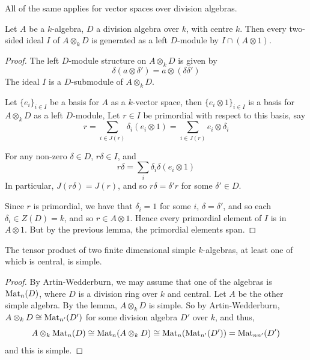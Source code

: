 \documentclass{article}
\begin{document}
\begin{remark}
    All of the same applies for vector spaces over division algebras.
\end{remark}

\begin{lemma}
    Let \(A\) be a \(k\)-algebra, \(D\) a division algebra over \(k\), with centre \(k\). Then every two-sided ideal \(I\) of \(A \otimes_k D\) is generated as a left \(D\)-module by \(I \cap (A \otimes 1)\). 
\end{lemma}

\begin{proof}
    The left \(D\)-module structure on \(A \otimes_k D\) is given by
    \[\delta(a \otimes \delta') = a \otimes (\delta\delta')\]
    The ideal \(I\) is a \(D\)-submodule of \(A \otimes_k D\). 
    
    Let \(\{e_i\}_{i \in I}\) be a basis for \(A\) as a \(k\)-vector space, then \(\{e_i \otimes 1\}_{i \in I}\) is a basis for \(A \otimes_k D\) as a left \(D\)-module, Let \(r \in I\) be primordial with respect to this basis, say
    \[r = \sum_{i \in J(r)}\delta_i(e_i \otimes 1) = \sum_{i \in J(r)} e_i \otimes \delta_i\]

    For any non-zero \(\delta \in D\), \(r\delta \in I\), and 
    \[r\delta = \sum_i \delta_i\delta(e_i \otimes 1)\]
    In particular, \(J(r\delta) = J(r)\), and so \(r\delta = \delta' r\) for some \(\delta' \in D\).

    Since \(r\) is primordial, we have that \(\delta_i = 1\) for some \(i\), \(\delta = \delta'\), and so each \(\delta_i \in Z(D) = k\), and so \(r \in A \otimes 1\). Hence every primordial element of \(I\) is in \(A \otimes 1\). But by the previous lemma, the primordial elements span.
\end{proof}

\begin{proposition}
    The tensor product of two finite dimensional simple \(k\)-algebras, at least one of whicb is central, is simple.
\end{proposition}

\begin{proof}
    By Artin-Wedderburn, we may assume that one of the algebras is \(\operatorname{Mat}_n(D)\), where \(D\) is a division ring over \(k\) and central. Let \(A\) be the other simple algebra. By the lemma, \(A \otimes_k D\) is simple. So by Artin-Wedderburn, \(A \otimes_k D \cong \operatorname{Mat}_{n'}(D')\) for some division algebra \(D'\) over \(k\), and thus,
    \[A \otimes_k \operatorname{Mat}_n(D) \cong \operatorname{Mat}_n(A \otimes_k D) \cong \operatorname{Mat}_n(\operatorname{Mat}_{n'}(D')) = \operatorname{Mat}_{nn'}(D')\]
    and this is simple.
\end{proof}
\end{document}
